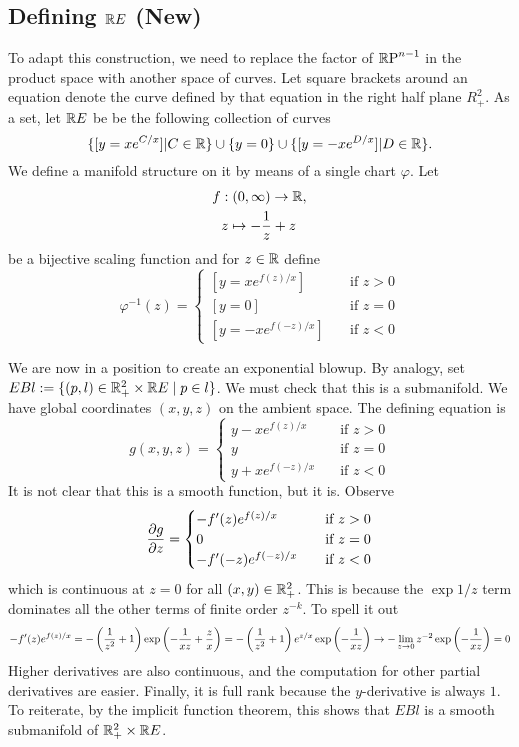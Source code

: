 \subsection{Defining $\mathbb{R} E$ (New)}

To adapt this construction, we need to replace the factor of $\mathbb{R}\text{P}^{n-1}$ in the product space with another space of curves. Let square brackets around an equation denote the curve defined by that equation in the right half plane $R^2_+$. As a set, let $\mathbb{R} E$ be be the following collection of curves
\[
\{ [y = xe^{C/x}] | C \in \mathbb{R} \} \cup \{ y=0 \} \cup \{ [y = -xe^{D/x}] | D \in \mathbb{R} \}.
\]
We define a manifold structure on it by means of a single chart $φ$. Let
\begin{align*}
f :& \;(0,\infty) \to \mathbb{R}, \\
z &\mapsto -\frac{1}{z} + z
\end{align*}
be a bijective scaling function and for $z\in\mathbb{R}$ define
\[
φ^{-1}(z) =
\begin{cases}
[y = xe^{f(z)/x}]    & \quad \text{if } z>0 \\
[y = 0]    & \quad \text{if } z=0 \\
[y = -xe^{f(-z)/x}]    & \quad \text{if } z<0
\end{cases}
\]

We are now in a position to create an exponential blowup. By analogy, set $EBl := \{ (p, l) \in \mathbb{R}^2_+ \times \mathbb{R} E \mid p \in l \}$. We must check that this is a submanifold. We have global coordinates $(x,y,z)$ on the ambient space. The defining equation is
\[
g(x,y,z) =
\begin{cases}
y - xe^{f(z)/x}    & \quad \text{if } z>0 \\
y      & \quad \text{if } z = 0 \\
y + xe^{f(-z)/x}    & \quad \text{if } z<0
\end{cases}
\]
It is not clear that this is a smooth function, but it is. Observe
\[
\frac{\partial g}{\partial z} =
\begin{cases}
-f'(z)e^{f(z)/x}    & \quad \text{if } z>0 \\
0      & \quad \text{if } z = 0 \\
-f'(-z)e^{f(-z)/x}    & \quad \text{if } z<0
\end{cases}
\]
which is continuous at $z=0$ for all $(x,y) \in \mathbb{R}^2_+$. This is because the $\exp 1/z$ term dominates all the other terms of finite order $z^{-k}$. To spell it out
\[
-f'(z)e^{f(z)/x}
= -\left(\frac{1}{z^2} + 1\right) \exp\left(-\frac{1}{xz} + \frac{z}{x}\right)
= -\left(\frac{1}{z^2} + 1\right) e^{z/x}\exp\left(-\frac{1}{xz}\right)
\to - \lim_{z\to 0} z^{-2} \exp\left(-\frac{1}{xz}\right) = 0
\]
Higher derivatives are also continuous, and the computation for other partial derivatives are easier. Finally, it is full rank because the $y$-derivative is always $1$. To reiterate, by the implicit function theorem, this shows that $EBl$ is a smooth submanifold of $\mathbb{R}^2_+\times\mathbb{R} E$.

